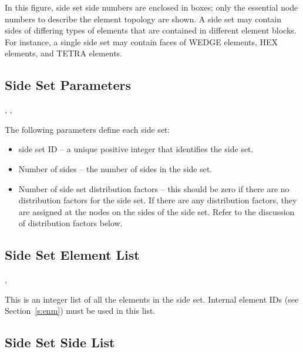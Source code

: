  In this figure, side set side numbers are enclosed in boxes; only the
 essential node numbers to describe the element topology are shown. A
 side set may contain sides of differing types of elements that are
 contained in different element blocks. For instance, a single side
 set may contain faces of WEDGE elements, HEX elements, and TETRA
 elements.



\subsection{Side Set Parameters}



\begin{spacing}{1.5}
\api {}, , 
\end{spacing}

{The following parameters define each side set:}

\begin{itemize}
 \item {side set ID -- a unique positive integer that identifies the
 side set.}

 \item {Number of sides -- the number of sides in the side 
set.}

 \item {Number of side set distribution factors -- this should be zero
 if there are no distribution factors for the side set. If there are
 any distribution factors, they are assigned at the nodes on the sides
 of the side set. Refer to the discussion of distribution factors
 below.}
\end{itemize}

\subsection{Side Set Element List}



\begin{spacing}{1.5}
\api {}, 
\end{spacing}

{This is an integer list of all the elements in the side set. 
Internal element IDs (see  Section~\ref{s:enm}) must be used 
in this list.}



\subsection{Side Set Side List}



